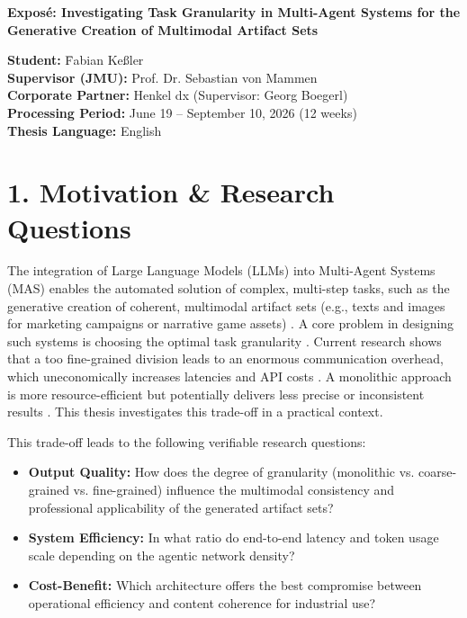 \documentclass[12pt,a4paper]{article}
\begin{document}

\begin{center}
\Large\textbf{Exposé: Investigating Task Granularity in Multi-Agent Systems for the Generative Creation of Multimodal Artifact Sets}
\end{center}
\vspace{1em}

\begin{tabbing}
\textbf{Student:} \hspace{3cm} \= Fabian Keßler \\
\textbf{Supervisor (JMU):} \> Prof. Dr. Sebastian von Mammen \\
\textbf{Corporate Partner:} \> Henkel dx (Supervisor: Georg Boegerl) \\
\textbf{Processing Period:} \> June 19 -- September 10, 2026 (12 weeks) \\
\textbf{Thesis Language:} \> English
\end{tabbing}
\vspace{1em}

\normalsize

\section*{1. Motivation \& Research Questions}
The integration of Large Language Models (LLMs) into Multi-Agent Systems (MAS) enables the automated solution of complex, multi-step tasks, such as the generative creation of coherent, multimodal artifact sets (e.g., texts and images for marketing campaigns or narrative game assets) \cite{lin2025}. A core problem in designing such systems is choosing the optimal task granularity \cite{chen2026}. Current research shows that a too fine-grained division leads to an enormous communication overhead, which uneconomically increases latencies and API costs \cite{salim2026}. A monolithic approach is more resource-efficient but potentially delivers less precise or inconsistent results \cite{chen2026}. This thesis investigates this trade-off in a practical context.

This trade-off leads to the following verifiable research questions:
\begin{itemize}
    \item \textbf{Output Quality:} How does the degree of granularity (monolithic vs. coarse-grained vs. fine-grained) influence the multimodal consistency and professional applicability of the generated artifact sets?
    \item \textbf{System Efficiency:} In what ratio do end-to-end latency and token usage scale depending on the agentic network density?
    \item \textbf{Cost-Benefit:} Which architecture offers the best compromise between operational efficiency and content coherence for industrial use?
\end{itemize}
\end{document}
